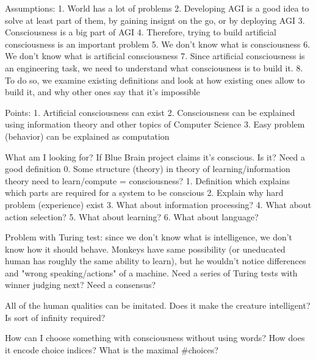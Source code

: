 \documentclass[a4paper]{article}
\begin{document}
Assumptions:
1. World has a lot of problems
2. Developing AGI is a good idea to solve at least part of them, by gaining insignt on the go, or by deploying AGI
3. Consciousness is a big part of AGI
4. Therefore, trying to build artificial consciousness is an important problem
5. We don't know what is consciousness
6. We don't know what is artificial consciousness
7. Since artificial consciousness is an engineering task, we need to understand what consciousness is to build it.
8. To do so, we examine existing definitions and look at how existing ones allow to build it, and why other ones say that it's impossible

Points:
1. Artificial consciousness can exist
2. Consciousness can be explained using information theory and other topics of Computer Science
3. Easy problem (behavior) can be explained as computation

What am I looking for?
If Blue Brain project claims it’s conscious. Is it? Need a good definition
0. Some structure (theory) in theory of learning/information theory need to learn/compute = consciousness?
1. Definition which explains which parts are required for a system to be conscious
2. Explain why hard problem (experience) exist
3. What about information processing?
4. What about action selection?
5. What about learning?
6. What about language?


Problem with Turing test: since we don't know what is intelligence, we don't know how it should behave. Monkeys have same possibility (or uneducated human has roughly the same ability to learn), but he wouldn't notice differences and "wrong speaking/actions" of a machine. Need a series of Turing tests with winner judging next? Need a consensus? 

All of the human qualities can be imitated. Does it make the creature intelligent? Is sort of infinity required?

How can I choose something with consciousness without using words? How does it encode choice indices? What is the maximal \#choices?

\end{document}
